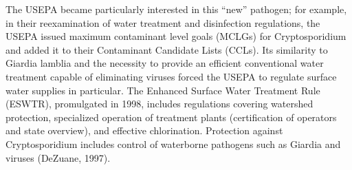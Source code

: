 \documentclass{article}
\begin{document}
The USEPA became particularly interested in this ``new'' pathogen; for
example, in their reexamination of water treatment and disinfection
regulations, the USEPA issued maximum contaminant level goals (MCLGs)
for Cryptosporidium and added it to their Contaminant Candidate Lists
(CCLs). Its similarity to Giardia lamblia and the necessity to provide
an efficient conventional water treatment capable of eliminating viruses
forced the USEPA to regulate surface water supplies in particular. The
Enhanced Surface Water Treatment Rule (ESWTR), promulgated in 1998,
includes regulations covering watershed protection, specialized
operation of treatment plants (certification of operators and state
overview), and effective chlorination. Protection against
Cryptosporidium includes control of waterborne pathogens such as Giardia
and viruses (DeZuane, 1997).
\end{document}
